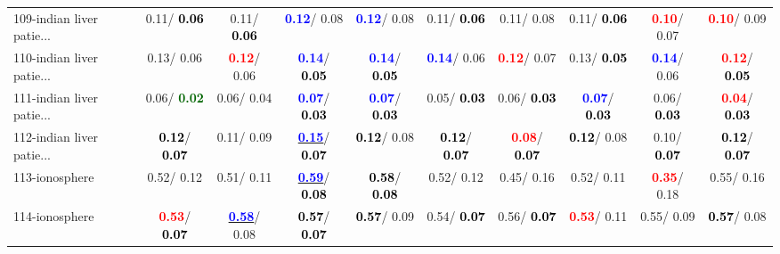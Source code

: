 \begin{table}[h]
\begin{center}
{\begin{tabular}{lc|c|c|c|c|c|c|c|c}
109-indian liver patie... &   0.11/\textcolor{black}{\textbf{  0.06}} &   0.11/\textcolor{black}{\textbf{  0.06}} & \textcolor{blue}{\textbf{  0.12}}/  0.08 & \textcolor{blue}{\textbf{  0.12}}/  0.08 &   0.11/\textcolor{black}{\textbf{  0.06}} &   0.11/  0.08 &   0.11/\textcolor{black}{\textbf{  0.06}} & \textcolor{red}{\textbf{  0.10}}/  0.07 & \textcolor{red}{\textbf{  0.10}}/  0.09 \\
110-indian liver patie... &   0.13/  0.06 & \textcolor{red}{\textbf{  0.12}}/  0.06 & \textcolor{blue}{\textbf{  0.14}}/\textcolor{black}{\textbf{  0.05}} & \textcolor{blue}{\textbf{  0.14}}/\textcolor{black}{\textbf{  0.05}} & \textcolor{blue}{\textbf{  0.14}}/  0.06 & \textcolor{red}{\textbf{  0.12}}/  0.07 &   0.13/\textcolor{black}{\textbf{  0.05}} & \textcolor{blue}{\textbf{  0.14}}/  0.06 & \textcolor{red}{\textbf{  0.12}}/\textcolor{black}{\textbf{  0.05}} \\ \hline
111-indian liver patie... &   0.06/\textcolor{darkgreen}{\textbf{  0.02}} &   0.06/  0.04 & \textcolor{blue}{\textbf{  0.07}}/\textcolor{black}{\textbf{  0.03}} & \textcolor{blue}{\textbf{  0.07}}/\textcolor{black}{\textbf{  0.03}} &   0.05/\textcolor{black}{\textbf{  0.03}} &   0.06/\textcolor{black}{\textbf{  0.03}} & \textcolor{blue}{\textbf{  0.07}}/\textcolor{black}{\textbf{  0.03}} &   0.06/\textcolor{black}{\textbf{  0.03}} & \textcolor{red}{\textbf{  0.04}}/\textcolor{black}{\textbf{  0.03}} \\
112-indian liver patie... & \textcolor{black}{\textbf{  0.12}}/\textcolor{black}{\textbf{  0.07}} &   0.11/  0.09 & \underline{\textcolor{blue}{\textbf{  0.15}}}/\textcolor{black}{\textbf{  0.07}} & \textcolor{black}{\textbf{  0.12}}/  0.08 & \textcolor{black}{\textbf{  0.12}}/\textcolor{black}{\textbf{  0.07}} & \textcolor{red}{\textbf{  0.08}}/\textcolor{black}{\textbf{  0.07}} & \textcolor{black}{\textbf{  0.12}}/  0.08 &   0.10/\textcolor{black}{\textbf{  0.07}} & \textcolor{black}{\textbf{  0.12}}/\textcolor{black}{\textbf{  0.07}} \\
113-ionosphere &   0.52/  0.12 &   0.51/  0.11 & \underline{\textcolor{blue}{\textbf{  0.59}}}/\textcolor{black}{\textbf{  0.08}} & \textcolor{black}{\textbf{  0.58}}/\textcolor{black}{\textbf{  0.08}} &   0.52/  0.12 &   0.45/  0.16 &   0.52/  0.11 & \textcolor{red}{\textbf{  0.35}}/  0.18 &   0.55/  0.16 \\
114-ionosphere & \textcolor{red}{\textbf{  0.53}}/\textcolor{black}{\textbf{  0.07}} & \underline{\textcolor{blue}{\textbf{  0.58}}}/  0.08 & \textcolor{black}{\textbf{  0.57}}/\textcolor{black}{\textbf{  0.07}} & \textcolor{black}{\textbf{  0.57}}/  0.09 &   0.54/\textcolor{black}{\textbf{  0.07}} &   0.56/\textcolor{black}{\textbf{  0.07}} & \textcolor{red}{\textbf{  0.53}}/  0.11 &   0.55/  0.09 & \textcolor{black}{\textbf{  0.57}}/  0.08 \\

\end{tabular}}
\end{center}
\end{table}
